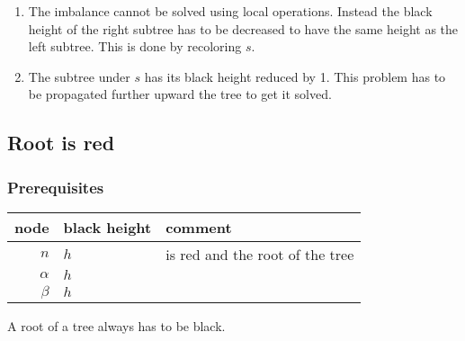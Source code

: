 \documentclass[a4paper,10pt,twoside]{article}
\begin{document}
\begin{enumerate}
\item The imbalance cannot be solved using local operations. Instead the black
height of the right subtree has to be decreased to have the same height as
the left subtree. This is done by recoloring $s$.

\begin{center}
\end{center}


\item The subtree under $s$ has its black height reduced by 1. This problem
has to be propagated further upward the tree to get it solved.


\end{enumerate}


\newpage
\subsection{Root is red}

\subsubsection{Prerequisites}

\begin{center}
\begin{tabular}{|r||l|l|}
\hline
node		&	black height	&	comment	\\
\hline
\hline
$n$		&	$h$	&	is red and the root of the tree	\\\hline
$\alpha$	&	$h$	&		\\\hline
$\beta$		&	$h$	&		\\\hline
\end{tabular}
\end{center}

A root of a tree always has to be black.

\begin{center}
\end{center}
\end{document}
